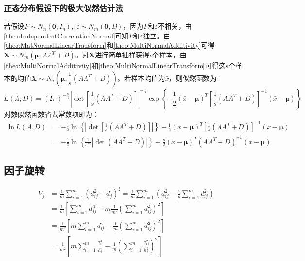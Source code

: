 \subsubsection{正态分布假设下的极大似然估计法}
\begin{derivation}
	若假设$F\sim N_n(\mathbf{0},I_n),\;\varepsilon\sim N_m(\mathbf{0},D)$，因为$F$和$\varepsilon$不相关，由\cref{theo:IndependentCorrelationNormal}可知$F$和$\varepsilon$独立。由\cref{theo:MatNormalLinearTransform}和\cref{theo:MultiNormalAdditivity}可得$\mathbf{X}\sim N_m(\boldsymbol{\mu},AA^T+D)$。对$\mathbf{X}$进行简单抽样获得$s$个样本，由\cref{theo:MultiNormalAdditivity}和\cref{theo:MultiNormalLinearTransform}可得这$s$个样本的均值$\bar{\mathbf{X}}\sim N_n\left(\boldsymbol{\mu},\dfrac{1}{s}(AA^T+D)\right)$。若样本均值为$\bar{x}$，则似然函数为：
	\begin{equation*}
		L(A,D)=(2\pi)^{-\frac{m}{2}}|\det[\frac{1}{s}(AA^T+D)]|^{-\frac{1}{2}}\exp\left\{-\frac{1}{2}(\bar{x}-\boldsymbol{\mu})^T\left[\frac{1}{s}(AA^T+D)\right]^{-1}(\bar{x}-\boldsymbol{\mu})\right\}
	\end{equation*}
	对数似然函数省去常数项即为：
	\begin{align*}
		\ln L(A,D)&=-\frac{1}{2}\ln\left\{\left|\det\left[\frac{1}{s}(AA^T+D)\right]\right|\right\}-\frac{1}{2}(\bar{x}-\boldsymbol{\mu})^T\left[\frac{1}{s}(AA^T+D)\right]^{-1}(\bar{x}-\boldsymbol{\mu}) \\
		&=-\frac{1}{2}\ln\left\{\frac{1}{s^m}\left|\det(AA^T+D)\right|\right\}-\frac{s}{2}(\bar{x}-\boldsymbol{\mu})^T(AA^T+D)^{-1}(\bar{x}-\boldsymbol{\mu})
	\end{align*}
\end{derivation}

\subsection{因子旋转}
\begin{align*}
	V_j&=\frac{1}{m}\sum_{i=1}^{m}(d_{ij}^2-\bar{d}_j)^2=\frac{1}{m}\sum_{i=1}^{m}\left(d_{ij}^2-\frac{1}{p}\sum_{i=1}^{m}d_{ij}^2\right) \\
	&=\frac{1}{m}\left[\sum_{i=1}^{m}d_{ij}^4-m\frac{1}{m^2}\left(\sum_{i=1}^{m}d_{ij}^2\right)^2\right] \\
	&=\frac{1}{m^2}\left[m\sum_{i=1}^{m}d_{ij}^4-\frac{1}{m}\left(\sum_{i=1}^{m}d_{ij}^2\right)^2\right] \\
	&=\frac{1}{m^2}\left[m\sum_{i=1}^{m}\frac{a_{ij}^4}{h_i^4}-\frac{1}{m}\left(\sum_{i=1}^{m}\frac{a_{ij}^2}{h_i^2}\right)^2\right]
\end{align*}